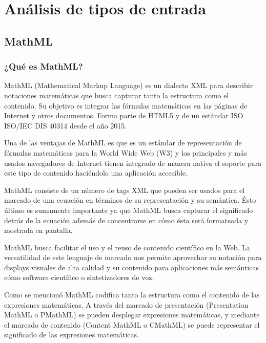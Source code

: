 
\chapter{Análisis de tipos de entrada}

\label{Chapter2} %


\section{MathML}


\subsection{¿Qué es MathML?}

MathML (Mathematical Markup Language) \cite{2} es un dialecto XML para describir notaciones matemáticas que busca capturar tanto la estructura
como el contenido. Su objetivo es integrar las fórmulas matemáticas en las páginas de Internet y otros documentos.
Forma parte de HTML5 y de un estándar ISO ISO/IEC DIS 40314 desde el año 2015.

Una de las ventajas de MathML es que es un estándar de representación de fórmulas matemáticas para la World Wide Web (W3) y los principales y más usados
navegadores de Internet tienen integrado de manera nativa el soporte para este tipo de contenido haciéndolo una aplicación accesible.

MathML consiste de un número de tags XML que pueden ser usados
para el marcado de una ecuación en términos de su representación y su semántica. Ésto último es sumamente importante
ya que MathML busca capturar el significado detrás de la ecuación además de concentrarse en cómo ésta será formateada y mostrada en pantalla.

MathML busca facilitar el uso y el reuso de contenido científico en la Web. La versatilidad de este lenguaje de marcado nos permite aprovechar
su notación para displays visuales de alta calidad y su contenido para aplicaciones más semánticas cómo software científico o sintetizadores de voz.

Como se mencionó MathML codifica tanto la estructura como el contenido de las expresiones matemáticas.
A través del marcado de presentación (Presentation MathML o PMathML) se pueden desplegar expresiones matemáticas, y mediante el marcado de contenido
(Content MathML o CMathML) se puede representar el significado de las expresiones matemáticas.

